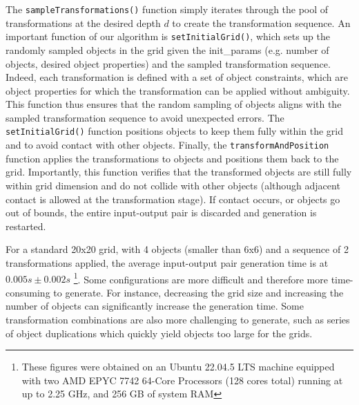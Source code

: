 The \texttt{sampleTransformations()} function simply iterates through the pool of transformations at the desired depth $d$ to create the transformation sequence. An important function of our algorithm is \texttt{setInitialGrid()}, which sets up the randomly sampled objects in the grid given the init\_params (e.g. number of objects, desired object properties) and the sampled transformation sequence. Indeed, each transformation is defined with a set of object constraints, which are object properties for which the transformation can be applied without ambiguity. This function thus ensures that the random sampling of objects aligns with the sampled transformation sequence to avoid unexpected errors. The \texttt{setInitialGrid()} function positions objects to keep them fully within the grid and to avoid contact with other objects. Finally, the \texttt{transformAndPosition} function applies the transformations to objects and positions them back to the grid. Importantly, this function verifies that the transformed objects are still fully within grid dimension and do not collide with other objects (although adjacent contact is allowed at the transformation stage). If contact occurs, or objects go out of bounds, the entire input-output pair is discarded and generation is restarted. 

For a standard 20x20 grid, with 4 objects (smaller than 6x6) and a sequence of 2 transformations applied, the average input-output pair generation time is at $0.005s \pm 0.002s$ \footnote{These figures were obtained on an Ubuntu 22.04.5 LTS machine equipped with two AMD EPYC 7742 64-Core Processors (128 cores total) running at up to 2.25 GHz, and 256 GB of system RAM}. Some configurations are more difficult and therefore more time-consuming to generate. For instance, decreasing the grid size and increasing the number of objects can significantly increase the generation time. Some transformation combinations are also more challenging to generate, such as series of object duplications which quickly yield objects too large for the grids. 